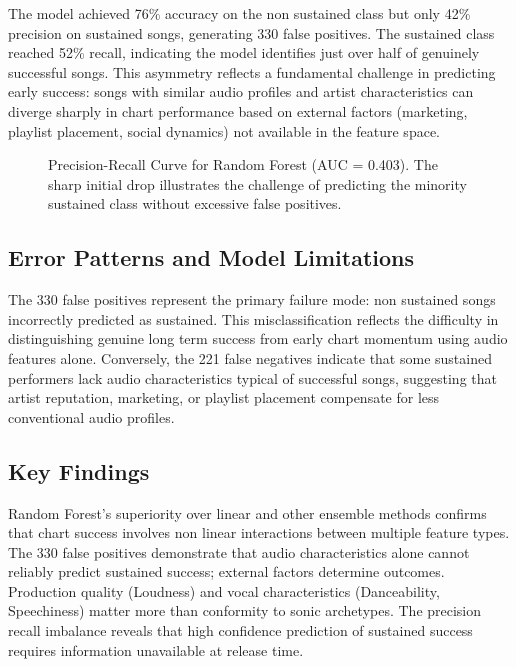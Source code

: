 \documentclass{article}
\begin{document}
The model achieved 76\% accuracy on the non sustained class but only 42\% precision on sustained songs, generating 330 false positives. The sustained class reached 52\% recall, indicating the model identifies just over half of genuinely successful songs. This asymmetry reflects a fundamental challenge in predicting early success: songs with similar audio profiles and artist characteristics can diverge sharply in chart performance based on external factors (marketing, playlist placement, social dynamics) not available in the feature space.

\begin{figure}[h]
\centering

\caption{Precision-Recall Curve for Random Forest (AUC = 0.403). The sharp initial drop illustrates the challenge of predicting the minority sustained class without excessive false positives.}
\label{fig:precision_recall}
\end{figure}

\subsection*{Error Patterns and Model Limitations}

The 330 false positives represent the primary failure mode: non sustained songs incorrectly predicted as sustained. This misclassification reflects the difficulty in distinguishing genuine long term success from early chart momentum using audio features alone. Conversely, the 221 false negatives indicate that some sustained performers lack audio characteristics typical of successful songs, suggesting that artist reputation, marketing, or playlist placement compensate for less conventional audio profiles.

\subsection*{Key Findings}

Random Forest's superiority over linear and other ensemble methods confirms that chart success involves non linear interactions between multiple feature types. The 330 false positives demonstrate that audio characteristics alone cannot reliably predict sustained success; external factors determine outcomes. Production quality (Loudness) and vocal characteristics (Danceability, Speechiness) matter more than conformity to sonic archetypes. The precision recall imbalance reveals that high confidence prediction of sustained success requires information unavailable at release time.
\end{document}
